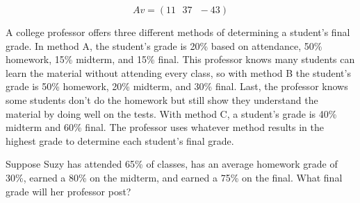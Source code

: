 \begin{Answer}[ref=vector-matrix-multiply01]
$$Av = (11 \text{ }37 \text{ } -43)$$
\end{Answer}

\begin{Exercise}[title = {Using Vector Matrix Multiplication}, label = vmm02]
A college professor offers three different methods of determining a student's final grade. In method A, the student's grade is 20\% based on attendance, 50\% homework, 15\% midterm, and 15\% final. This professor knows many students can learn the material without attending every class, so with method B the student's grade is 50\% homework, 20\% midterm, and 30\% final. Last, the professor knows some students don't do the homework but still show they understand the material by doing well on the tests. With method C, a student's grade is 40\% midterm and 60\% final. The professor uses whatever method results in the highest grade to determine each student's final grade. 

Suppose Suzy has attended 65\% of classes, has an average homework grade of 30\%, earned a 80\% on the midterm, and earned a 75\% on the final. What final grade will her professor post?
\end{Exercise}


